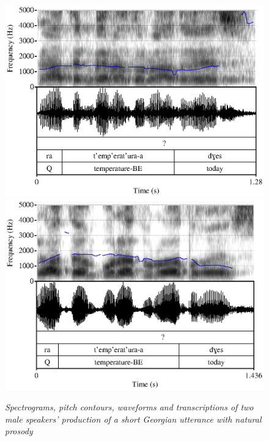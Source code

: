 \documentclass[12pt]{amsart}
\begin{document}
\begin{figure}
    \centering
        \includegraphics[scale=0.6]{prosody1}
        \includegraphics[scale=0.6]{prosody2}
    \caption{\footnotesize{\textit{\textsc{} Spectrograms, pitch contours, waveforms and transcriptions of two male speakers' production of a short Georgian utterance with natural prosody}}}\label{fig:prosody}
\end{figure}


\end{document}
